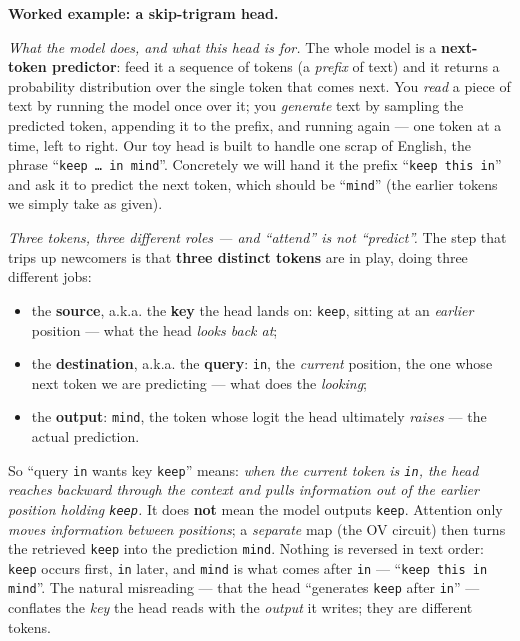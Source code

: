 \begin{callout}
\textbf{Worked example: a skip-trigram head.}

\emph{What the model does, and what this head is for.} The whole model is a \textbf{next-token predictor}: feed it a sequence of tokens (a \emph{prefix} of text) and it returns a probability distribution over the single token that comes next. You \emph{read} a piece of text by running the model once over it; you \emph{generate} text by sampling the predicted token, appending it to the prefix, and running again --- one token at a time, left to right. Our toy head is built to handle one scrap of English, the phrase ``\texttt{keep \dots\ in mind}''. Concretely we will hand it the prefix ``\texttt{keep this in}'' and ask it to predict the next token, which should be ``\texttt{mind}'' (the earlier tokens we simply take as given).

\emph{Three tokens, three different roles --- and ``attend'' is not ``predict''.} The step that trips up newcomers is that \textbf{three distinct tokens} are in play, doing three different jobs:
\begin{itemize}
\item the \textbf{source}, a.k.a. the \textbf{key} the head lands on: \texttt{keep}, sitting at an \emph{earlier} position --- what the head \emph{looks back at};
\item the \textbf{destination}, a.k.a. the \textbf{query}: \texttt{in}, the \emph{current} position, the one whose next token we are predicting --- what does the \emph{looking};
\item the \textbf{output}: \texttt{mind}, the token whose logit the head ultimately \emph{raises} --- the actual prediction.
\end{itemize}
So ``query \texttt{in} wants key \texttt{keep}'' means: \emph{when the current token is \texttt{in}, the head reaches backward through the context and pulls information out of the earlier position holding \texttt{keep}.} It does \textbf{not} mean the model outputs \texttt{keep}. Attention only \emph{moves information between positions}; a \emph{separate} map (the OV circuit) then turns the retrieved \texttt{keep} into the prediction \texttt{mind}. Nothing is reversed in text order: \texttt{keep} occurs first, \texttt{in} later, and \texttt{mind} is what comes after \texttt{in} --- ``\texttt{keep this in mind}''. The natural misreading --- that the head ``generates \texttt{keep} after \texttt{in}'' --- conflates the \emph{key} the head reads with the \emph{output} it writes; they are different tokens.


\end{callout}
